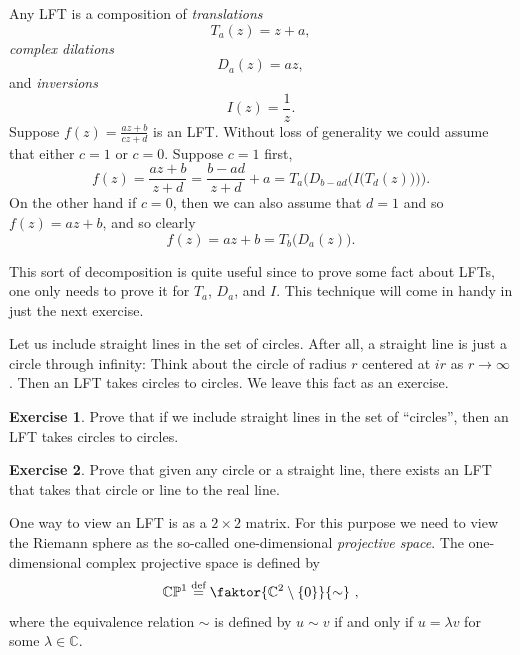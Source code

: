 \documentclass[12pt,openany]{book}
\newcommand{\C}{{\mathbb{C}}}
\newcommand{\bP}{{\mathbb{P}}}
\newcommand{\myindex}[1]{#1\index{#1}}
\theoremstyle{plain}
\theoremstyle{remark}
\theoremstyle{definition}
\newenvironment{exbox}{%
    \def\FrameCommand{\vrule width 1pt \relax\hspace {10pt}}%
    \MakeFramed {\advance \hsize -\width \FrameRestore }%
}{%
    \endMakeFramed
}
\theoremstyle{exercise}
\newtheorem{exercise}{Exercise}[section]
\theoremstyle{example}
\begin{document}
Any LFT is a composition of \emph{translations}
\begin{equation*}
T_a(z) = z + a ,
\end{equation*}
\emph{complex dilations}
\begin{equation*}
D_a(z) = az ,
\end{equation*}
and \emph{inversions}
\begin{equation*}
I(z) = \frac{1}{z}.
\end{equation*}
Suppose $f(z) = \frac{az+b}{cz+d}$ is an LFT.
Without loss of generality we could assume that either $c=1$ or $c=0$.
Suppose $c=1$ first,
\begin{equation*}
f(z)
=
\frac{a z + b}{z + d}
=
\frac{b-ad}{z+d}+a
=
T_a\biggr(D_{b-ad}\Bigr(I\bigl(T_d(z)\bigr)\Bigr)\biggr) .
\end{equation*}
On the other hand if $c=0$, then we can also assume that $d=1$ and
so $f(z) = az + b$, and so clearly
\begin{equation*}
f(z) = az+b = T_b\bigl(D_a(z)\bigr) .
\end{equation*}

This sort of decomposition is quite useful since to prove some fact about
LFTs, one only needs to prove it for $T_a$, $D_a$, and $I$.  This technique
will come in handy in just the next exercise.

Let us include straight lines in the set of circles.  After all, a straight
line is just a circle through infinity: Think about the circle of radius $r$
centered at $ir$ as $r \to \infty$.  Then an LFT takes circles to circles.
We leave this fact as an exercise.

\begin{exbox}
\begin{exercise}
Prove that if we include straight lines in the set of ``circles'', then
an LFT takes circles to circles.
\end{exercise}

\begin{exercise} \label{exercise:anycircletorealline}
Prove that given any circle or a straight line, there exists an LFT
that takes that circle or line to the real line.
\end{exercise}
\end{exbox}

One way to view an LFT is as a $2 \times 2$ matrix.  For this purpose
we need to view the Riemann sphere as the so-called one-dimensional
\emph{\myindex{projective space}}.  The one-dimensional complex projective
space is defined by
\begin{equation*}
\C \bP^1
\overset{\text{def}}{=}
\faktor{\C^2 \setminus \{ 0\}}{\sim} \ ,
\end{equation*}
where the equivalence relation $\sim$ is defined by
$u \sim v$ if and only if $u = \lambda v$ for some $\lambda \in \C$.
\end{document}
